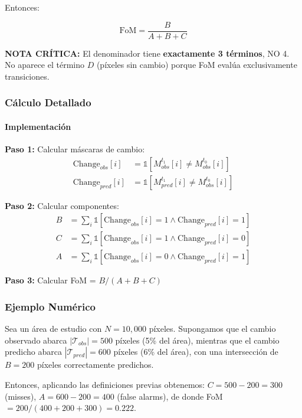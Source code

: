 Entonces:

\begin{equation}
\boxed{\text{FoM} = \frac{B}{A + B + C}}
\label{eq:fom_formula}
\end{equation}

\textbf{NOTA CRÍTICA:} El denominador tiene \textbf{exactamente 3 términos}, NO 4. No aparece el término $D$ (píxeles sin cambio) porque FoM evalúa exclusivamente transiciones.

\subsubsection{Cálculo Detallado}

\paragraph{Implementación}

\textbf{Paso 1:} Calcular máscaras de cambio:
\begin{align}
\text{Change}_{obs}[i] &= \mathbb{1}[M_{obs}^{t_1}[i] \neq M_{obs}^{t_0}[i]] \\
\text{Change}_{pred}[i] &= \mathbb{1}[M_{pred}^{t_1}[i] \neq M_{obs}^{t_0}[i]]
\end{align}

\textbf{Paso 2:} Calcular componentes:
\begin{align}
B &= \sum_{i} \mathbb{1}[\text{Change}_{obs}[i] = 1 \land \text{Change}_{pred}[i] = 1] \\
C &= \sum_{i} \mathbb{1}[\text{Change}_{obs}[i] = 1 \land \text{Change}_{pred}[i] = 0] \\
A &= \sum_{i} \mathbb{1}[\text{Change}_{obs}[i] = 0 \land \text{Change}_{pred}[i] = 1]
\end{align}

\textbf{Paso 3:} Calcular FoM = $B/(A+B+C)$

\subsubsection{Ejemplo Numérico}

Sea un área de estudio con $N = 10{,}000$ píxeles. Supongamos que el cambio observado abarca $|\mathcal{T}_{obs}| = 500$ píxeles (5\% del área), mientras que el cambio predicho abarca $|\mathcal{T}_{pred}| = 600$ píxeles (6\% del área), con una intersección de $B = 200$ píxeles correctamente predichos.

Entonces, aplicando las definiciones previas obtenemos: $C = 500-200=300$ (misses), $A=600-200=400$ (false alarms), de donde FoM $= 200/(400+200+300) = 0.222$.

